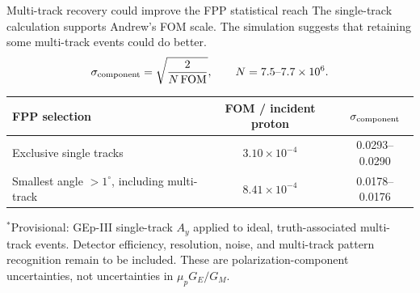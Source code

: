 \documentclass[aspectratio=169,10pt]{beamer}
\begin{document}
\begin{frame}{Multi-track recovery could improve the FPP statistical reach}
  \small
  The single-track calculation supports Andrew's FOM scale. The simulation
  suggests that retaining some multi-track events could do better.
  \[
    \sigma_{\rm component}=\sqrt{\frac{2}{N\,\mathrm{FOM}}},
    \qquad N=7.5\text{--}7.7\times10^6.
  \]
  \begin{center}
    \renewcommand{\arraystretch}{1.25}
    \begin{tabular}{@{}lcc@{}}
      \toprule
      FPP selection & FOM / incident proton & $\sigma_{\rm component}$ \\
      \midrule
      Exclusive single tracks & $3.10\times10^{-4}$ & 0.0293--0.0290 \\
      Smallest angle $>1^\circ$, including multi-track & $8.41\times10^{-4}$ & 0.0178--0.0176\rlap{$^{*}$} \\
      \bottomrule
    \end{tabular}
  \end{center}
  \vspace{-0.10cm}
  {\scriptsize $^{*}$Provisional: GEp-III single-track $A_y$ applied to ideal,
  truth-associated multi-track events. Detector efficiency, resolution, noise,
  and multi-track pattern recognition remain to be included. These are
  polarization-component uncertainties, not uncertainties in $\mu_pG_E/G_M$.}
\end{frame}
\end{document}
